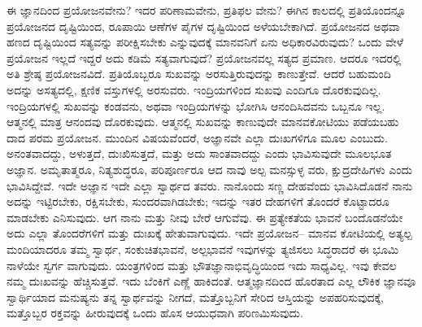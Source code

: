 ಈ ಜ್ಞಾನದಿಂದ ಪ್ರಯೋಜನವೇನು? ಇದರ ಪರಿಣಾಮವೇನು, ಪ್ರತಿಫಲ ವೇನು? ಈಗಿನ ಕಾಲದಲ್ಲಿ ಪ್ರತಿಯೊಂದನ್ನೂ ಪ್ರಯೋಜನದ ದೃಷ್ಟಿಯಿಂದ, ರೂಪಾಯಿ ಆಣೆಗಳ ಪೈಗಳ ದೃಷ್ಟಿಯಿಂದ ಅಳೆಯಬೇಕಾಗಿದೆ. ಪ್ರಯೋಜನದ ಅಥವಾ ಹಣದ ದೃಷ್ಟಿಯಿಂದ ಸತ್ಯವನ್ನು ಪರೀಕ್ಷಿಸಬೇಕು ಎನ್ನುವುದಕ್ಕೆ ಮಾನವನಿಗೆ ಏನು ಅಧಿಕಾರವಿರುವುದು? ಒಂದು ವೇಳೆ ಪ್ರಯೋಜನ ಇಲ್ಲದೆ ಇದ್ದರೆ ಅದು ಕಡಿಮೆ ಸತ್ಯವಾಗುವುದೆ? ಪ್ರಯೋಜನವಲ್ಲ ಸತ್ಯದ ಪ್ರಮಾಣ. ಆದರೂ ಇದರಲ್ಲಿ ಅತಿ ಶ್ರೇಷ್ಠ ಪ್ರಯೋಜನವಿದೆ. ಪ್ರತಿಯೊಬ್ಬರೂ ಸುಖವನ್ನು ಅರಸುತ್ತಿರುವುದನ್ನು ಕಾಣುತ್ತೇವೆ. ಆದರೆ ಬಹುಮಂದಿ ಅದನ್ನು ಅಸತ್ಯದಲ್ಲಿ, ಕ್ಷಣಿಕ ವಸ್ತುಗಳಲ್ಲಿ ಅರಸುವರು. ಇಂದ್ರಿಯಗಳಿಂದ ಸುಖವು ಎಂದಿಗೂ ದೊರಕುವುದಿಲ್ಲ. ಇಂದ್ರಿಯಗಳಲ್ಲಿ ಸುಖವನ್ನು ಕಂಡವನು, ಅಥವಾ ಇಂದ್ರಿಯಗಳನ್ನು ಭೋಗಿಸಿ ಆನಂದಿಸಿದವನು ಒಬ್ಬನೂ ಇಲ್ಲ. ಆತ್ಮನಲ್ಲಿ ಮಾತ್ರ ಆನಂದವು ದೊರಕುವುದು. ಆತ್ಮನಲ್ಲಿ ಸುಖವನ್ನು ಕಾಣುವುದೇ ಮಾನವಕೋಟಿಯು ಪಡೆಯಬಹು ದಾದ ಪರಮ ಪ್ರಯೋಜನ. ಮುಂದಿನ ವಿಷಯವೆಂದರೆ, ಅಜ್ಞಾನವೇ ಎಲ್ಲಾ ದುಃಖಗಳಿಗೂ ಮೂಲ ಎಂಬುದು. ಅನಂತವಾದದ್ದು, ಅಳುತ್ತದೆ, ದುಃಖಿಸುತ್ತದೆ, ಮತ್ತು ಅದು ಸಾಂತವಾದದ್ದು ಎಂದು ಭಾವಿಸುವುದೇ ಮೂಲಭೂತ ಅಜ್ಞಾನ. ಅಮೃತಾತ್ಮರೂ, ನಿತ್ಯಶುದ್ಧರೂ, ಪರಿಪೂರ್ಣರೂ ಆದ ನಾವು ಅಲ್ಪ ಮನಸ್ಸುಳ್ಳ ವರು, ಕ್ಷುದ್ರದೇಹಿಗಳು ಎಂದು ಭಾವಿಸಿದ್ದೇವೆ. ಇದೇ ಅಜ್ಞಾನ ಇದೇ ಎಲ್ಲಾ ಸ್ವಾರ್ಥದ ತವರು. ನಾನೊಂದು ಸಣ್ಣ ದೇಹವೆಂದು ಭಾವಿಸಿದೊಡನೆ ನಾನು ಅದನ್ನು ಇಟ್ಟಿರಬೇಕು, ರಕ್ಷಿಸಬೇಕು, ಸುಂದರವಾಗಿಡಬೇಕು; ಇದನ್ನು ಇತರ ದೇಹಗಳಿಗೆ ತೊಂದರೆ ಕೊಟ್ಟಾದರೂ ಮಾಡಬೇಕು ಎನಿಸುವುದು. ಆಗ ನಾನು ಮತ್ತು ನೀವು ಬೇರೆ ಆಗುವೆವು. ಈ ಪ್ರತ್ಯೇಕತೆಯ ಭಾವನೆ ಬಂದೊಡನೆಯೇ ಅದು ಎಲ್ಲಾ ತೊಂದರೆಗಳಿಗೆ ಮತ್ತು ದುಃಖಕ್ಕೆ ಹೇತುವಾಗುವುದು. ಇದೇ ಪ್ರಯೋಜನ– ಮಾನವ ಕೋಟಿಯಲ್ಲಿ ಅತ್ಯಲ್ಪ ಮಂದಿಯಾದರೂ ತಮ್ಮ ಸ್ವಾರ್ಥ, ಸಂಕುಚಿತಭಾವನೆ, ಅಲ್ಪಭಾವನೆ ಇವುಗಳನ್ನು ತ್ಯಜಿಸಲು ಸಿದ್ಧರಾದರೆ ಈ ಭೂಮಿ ನಾಳೆಯೇ ಸ್ವರ್ಗ ವಾಗುವುದು. ಯಂತ್ರಗಳಿಂದ ಮತ್ತು ಭೌತಜ್ಞಾನಾಭಿವೃದ್ಧಿಯಿಂದ ಇದು ಸಾಧ್ಯವಿಲ್ಲ. ಇವು ಕೇವಲ ನಮ್ಮ ದುಃಖವನ್ನು ಹೆಚ್ಚಿಸುತ್ತವೆ. ಇದು ಬೆಂಕಿಗೆ ಎಣ್ಣೆ ಹಾಕಿದಂತೆ. ಆತ್ಮಜ್ಞಾನದಿಂದ ಹೊರತಾದ ಎಲ್ಲ ಲೌಕಿಕ ಜ್ಞಾನವೂ ಸ್ವಾರ್ಥಿಯಾದ ಮನುಷ್ಯನು ತನ್ನ ಸ್ವಾರ್ಥವನ್ನು ನೀಗದೆ, ಮತ್ತೊಬ್ಬನಿಗೆ ಸೇರಿದ ಆಸ್ತಿಯನ್ನು ಅಪಹರಿಸುವುದಕ್ಕೆ, ಮತ್ತೊಬ್ಬರ ರಕ್ತವನ್ನು ಹೀರುವುದಕ್ಕೆ ಒಂದು ಹೊಸ ಆಯುಧವಾಗಿ ಪರಿಣಮಿಸುವುದು.


